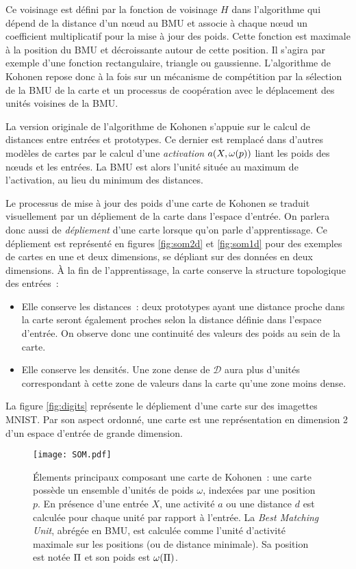 \documentclass[../main]{subfiles}
\begin{document}
Ce voisinage est défini par la fonction de voisinage $H$ dans l'algorithme qui dépend de la distance d'un n\oe{}ud au BMU et associe à chaque n\oe{}ud un coefficient multiplicatif pour la mise à jour des poids. 
Cette fonction est maximale à la position du BMU et décroissante autour de cette position. Il s'agira par exemple d'une fonction rectangulaire, triangle ou gaussienne.
L'algorithme de Kohonen repose donc à la fois sur un mécanisme de compétition par la sélection de la BMU de la carte et un processus de coopération avec le déplacement des unités voisines de la BMU.

La version originale de l'algorithme de Kohonen s'appuie sur le calcul de distances entre entrées et prototypes. Ce dernier est remplacé dans d'autres modèles de cartes par le calcul d'une \emph{activation} $a(X, \omega(p))$ liant les poids des n\oe{}uds et les entrées. La BMU est alors l'unité située au maximum de l'activation, au lieu du minimum des distances.


Le processus de mise à jour des poids d'une carte de Kohonen se traduit visuellement par un dépliement de la carte dans l'espace d'entrée. On parlera donc aussi de \emph{dépliement} d'une carte lorsque qu'on parle d'apprentissage. Ce dépliement est représenté en figures \ref{fig:som2d} et \ref{fig:som1d} pour des exemples de cartes en une et deux dimensions, se dépliant sur des données en deux dimensions.
\`A la fin de l'apprentissage, la carte conserve la structure topologique des entrées~:
\begin{itemize}
\item Elle conserve les distances~: deux prototypes ayant une distance proche dans la carte seront également proches selon la distance définie dans l'espace d'entrée. On observe donc une continuité des valeurs des poids au sein de la carte.
\item Elle conserve les densités. Une zone dense de $\mathcal{D}$ aura plus d'unités correspondant à cette zone de valeurs dans la carte qu'une zone moins dense.
\end{itemize}
La figure \ref{fig:digits} représente le dépliement d'une carte sur des imagettes MNIST.
Par son aspect ordonné, une carte est une représentation en dimension 2 d'un espace d'entrée de grande dimension.

\begin{figure}
    \centering
    \texttt{[image: SOM.pdf]}
    \caption{\'Elements principaux composant une carte de Kohonen~: une carte possède un ensemble d'unités de poids $\omega$, indexées par une position $p$. En présence d'une entrée $X$, une activité $a$ ou une distance $d$ est calculée pour chaque unité par rapport à l'entrée. La \emph{Best Matching Unit}, abrégée en BMU, est calculée comme l'unité d'activité maximale sur les positions (ou de distance minimale). Sa position est notée $\Pi$ et son poids est $\omega(\Pi)$.\label{fig:SOM}}
    \end{figure}
\end{document}
